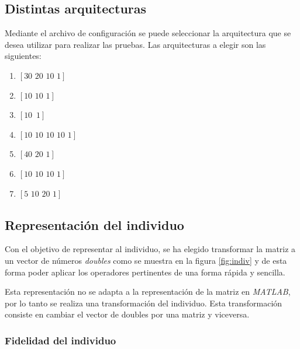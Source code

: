\documentclass{sig-alternate}
\begin{document}
	\subsection{Distintas arquitecturas}
	Mediante el archivo de configuración se puede seleccionar la arquitectura que se desea utilizar para realizar las pruebas. Las arquitecturas a elegir son las siguientes:

	\begin{center}
		\begin{enumerate}
			\item $[30\,\,20\,\,10\,\,1]$
			\item $[10\,\,10\,\,1]$
			\item $[10\,\,\,1]$
			\item $[10\,\,10\,\,10\,\,10\,\,1]$
			\item $[40\,\,20\,\,1]$
			\item $[10\,\,10\,\,10\,\,1]$
			\item $[5\,\,10\,\,20\,\,1]$
		\end{enumerate}
	\end{center}

	\subsection{Representación del individuo}
	Con el objetivo de representar al individuo, se ha elegido transformar
	la matriz a un vector de números \textit{doubles} como se muestra en
	la figura \ref{fig:indiv} y de esta forma poder aplicar los operadores
	pertinentes de una forma rápida y sencilla.

	Esta representación no se adapta a la representación de la matriz en
	\textit{MATLAB}, por lo tanto se realiza una transformación del individuo.
	Esta transformación consiste en cambiar el vector de doubles por una
	matriz y viceversa.

	\subsubsection{Fidelidad del individuo}
\end{document}
